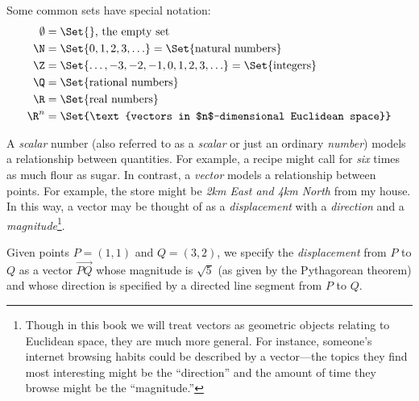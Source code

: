 
Some common sets have special notation:
\begin{align*}
	\emptyset &= \Set{}\text{, the empty set}\\
	\N &= \Set{0,1,2,3,\ldots}=\Set{\text{natural numbers}}\\
	\Z &= \Set{\ldots, -3,-2,-1,0,1,2,3,\ldots}=\Set{\text{integers}}\\
	\Q &= \Set{\text{rational numbers}}\\
	\R &= \Set{\text{real numbers}}\\
	\R^n &= \Set{\text{vectors in $n$-dimensional Euclidean space}}\\
\end{align*}



A \emph{scalar} number (also referred to as a \emph{scalar} or just an ordinary
\emph{number}) models a relationship between quantities. For example,
a recipe might call for \emph{six} times as much flour as sugar. In 
contrast, a \emph{vector} models a relationship between points. For example,
the store might be \emph{2km East and 4km North} from my house.
In this way, a vector may be thought of as a \emph{displacement} with a \emph{direction}
and a \emph{magnitude}\footnote{
	Though in this book we will treat vectors as geometric objects 
	relating to Euclidean
	space, they are much more general.  For instance, someone's internet
	browsing habits could be described by a vector---the topics they
	find most interesting might be the ``direction'' and the amount
	of time they browse might be the ``magnitude.''
}.

Given points $P=(1,1)$ and $Q=(3,2)$, we specify the
\emph{displacement} from $P$ to $Q$ as a vector
$\overrightarrow{PQ}$ whose magnitude is $\sqrt{5}$ (as given by the Pythagorean
theorem) and whose direction is specified by a directed line segment from $P$ to $Q$.

